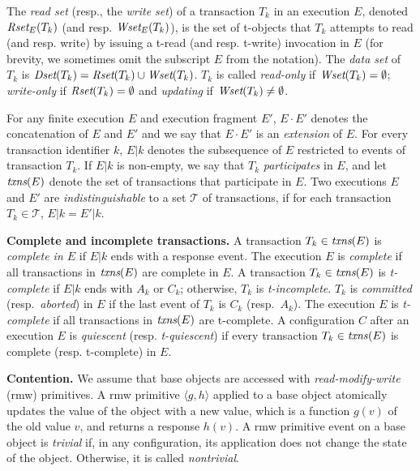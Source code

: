The \emph{read set} (resp., the \emph{write set}) of a transaction $T_k$ in an execution $E$,
denoted $\textit{Rset}_E(T_k)$ (and resp. $\textit{Wset}_E(T_k)$), is the set of t-objects that $T_k$ attempts to read (and resp. write) 
by issuing a t-read (and resp. t-write) invocation in $E$ (for brevity, we sometimes 
omit the subscript $E$ from the notation).
The \emph{data set} of $T_k$ is $\textit{Dset}(T_k)=\textit{Rset}(T_k)\cup\textit{Wset}(T_k)$.
$T_k$ is called \emph{read-only} if $\textit{Wset}(T_k)=\emptyset$; \emph{write-only} if $\textit{Rset}(T_k)=\emptyset$ and
\emph{updating} if $\textit{Wset}(T_k)\neq\emptyset$.

For any finite execution $E$ and execution fragment $E'$, $E\cdot E'$ denotes the concatenation of $E$ and $E'$
and we say that $E\cdot E'$ is an \emph{extension}
of $E$.
For every transaction identifier $k$,
$E|k$ denotes the subsequence of $E$ restricted to events of
transaction $T_k$.
If $E|k$ is non-empty,
we say that $T_k$ \emph{participates} in $E$,
and let $\textit{txns}(E)$ denote the set of transactions that participate in $E$.
Two executions $E$ and $E'$
are \emph{indistinguishable} to a set $\mathcal{T}$ of transactions, if
for each transaction $T_k \in \mathcal{T}$, $E|k=E'|k$.

\vspace{1mm}\noindent\textbf{Complete and incomplete transactions.}
A transaction $T_k\in \textit{txns}(E)$ is \emph{complete in $E$} if
$E|k$ ends with a response event.
The execution $E$ is \emph{complete} if all transactions in $\textit{txns}(E)$
are complete in $E$.
A transaction $T_k\in \textit{txns}(E)$ is \emph{t-complete} if $E|k$
ends with $A_k$ or $C_k$; otherwise, $T_k$ is \emph{t-incomplete}.
$T_k$ is \emph{committed} (resp.\ \emph{aborted}) in $E$
if the last event of $T_k$ is $C_k$ (resp.\ $A_k$).
The execution $E$ is \emph{t-complete} if all transactions in
$\textit{txns}(E)$ are t-complete.
A configuration $C$ after an execution $E$ is \emph{quiescent} (resp. \emph{t-quiescent}) if 
every transaction $T_k \in \ms{txns}(E)$ is complete (resp. t-complete) in $E$.

\vspace{1mm}\noindent\textbf{Contention.}
We assume that base objects are accessed with \emph{read-modify-write} (rmw) primitives. 
A rmw primitive $\langle g,h \rangle$ applied to a base object 
atomically updates the value of the object with a new value, which is
a function $g(v)$ of the old value $v$, and returns a response $h(v)$.
A rmw primitive event on a base object is \emph{trivial} if, in any configuration, its application
does not change the state of the object. 
Otherwise, it is called \emph{nontrivial}.

